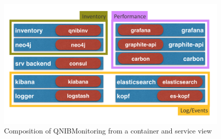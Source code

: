 \begin{figure}[!ht]
    \includegraphics[width=.4\textwidth]{images/png/qnibmon_arch.png}
    \caption{\label{fig:vortex_street}Composition of QNIBMonitoring from a container and service view}
\end{figure}